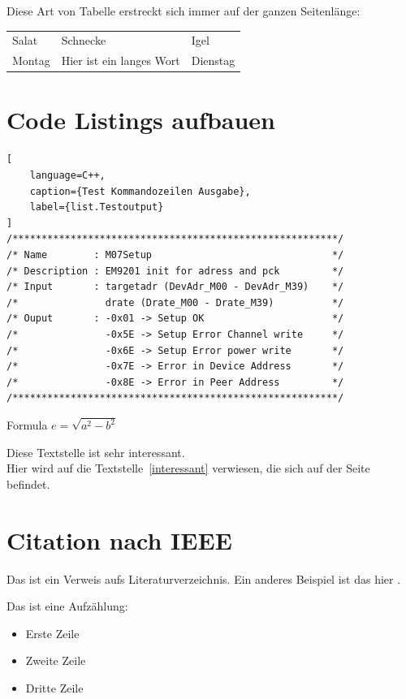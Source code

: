 Diese Art von Tabelle erstreckt sich immer auf der ganzen Seitenlänge:

\begin{tabularx}{\textwidth}{XXl}
  Salat & Schnecke & Igel\\
  Montag & Hier ist ein langes Wort & Dienstag
\end{tabularx}



\section{Code Listings aufbauen}\label{listing}

\begin{lstlisting}[
    language=C++,
    caption={Test Kommandozeilen Ausgabe},
    label={list.Testoutput}
]
/********************************************************/
/* Name        : M07Setup                               */
/* Description : EM9201 init for adress and pck         */
/* Input       : targetadr (DevAdr_M00 - DevAdr_M39)    */
/*               drate (Drate_M00 - Drate_M39)          */
/* Ouput       : -0x01 -> Setup OK                      */
/*               -0x5E -> Setup Error Channel write     */
/*               -0x6E -> Setup Error power write       */
/*               -0x7E -> Error in Device Address       */
/*               -0x8E -> Error in Peer Address         */
/********************************************************/
\end{lstlisting}

Formula $e = \sqrt{a{^2} - b^{2}}$


Diese Textstelle ist sehr interessant.\label{interessant}\\
Hier wird auf die Textstelle~\ref{interessant} verwiesen, die sich auf der Seite~\pageref{interessant} befindet.





\section{Citation nach IEEE}\label{citation}

Das ist ein \cite{robotvision} Verweis aufs Literaturverzeichnis. Ein anderes Beispiel ist das hier \cite{randompatterns}.





Das ist eine Aufzählung:
\begin{itemize} %
	\item Erste Zeile
	\item Zweite Zeile
	\item Dritte Zeile
\end{itemize}



